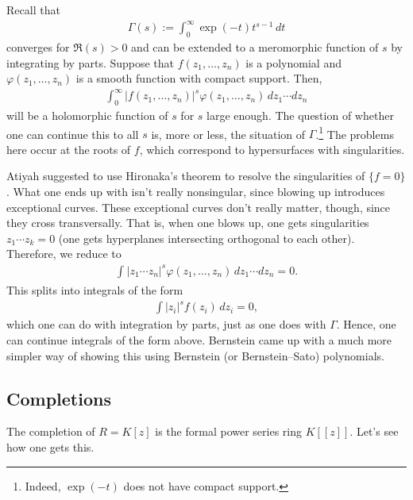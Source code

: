\documentclass [11 pt, oneside] {article}
\begin{document}
\begin{example}\label{}\text{}
Recall that
\begin{align*}
	\Gamma(s) :=  \int_{0}^{\infty}\exp(-t)t^{s-1}  \, dt
\end{align*}
	converges for $\Re (s)>0$ and can be extended to a meromorphic function of $s$ by integrating by parts. Suppose that $f(z_1,\hdots,z_n)$ is a polynomial and $\varphi(z_1,\hdots, z_n)$ is a smooth function with compact support. Then,
	\begin{align*}
		\int_{0}^{\infty} \left\lvert f(z_1,\hdots, z_n) \right\rvert ^s\varphi(z_1,\hdots,z_n)  \, dz_1\cdots dz_n 
	\end{align*}
	will be a holomorphic function of $s$ for $s$ large enough. The question of whether one can continue this to all $s$ is, more or less, the situation of $\Gamma$.\footnote{Indeed, $\exp({-t})$ does not have compact support.} The problems here occur at the roots of $f$, which correspond to hypersurfaces with singularities.
	
	Atiyah suggested to use Hironaka's theorem to resolve the singularities of $\{f=0\}$. What one ends up with isn't really nonsingular, since blowing up introduces exceptional curves. These exceptional curves don't really matter, though, since they cross transversally. That is, when one blows up, one gets singularities $z_1\cdots z_k=0$ (one gets hyperplanes intersecting orthogonal to each other). Therefore, we reduce to 
	\begin{align*}
		\int_{}^{}  \left\lvert z_1\cdots z_n \right\rvert^s\varphi(z_1,\hdots,z_n)   \, dz_1\cdots dz_n =0.
	\end{align*}
	This splits into integrals of the form
	\begin{align*}
		\int\left\lvert z_i \right\rvert ^sf(z_i)\, dz_i=0,
	\end{align*}
	which one can do with integration by parts, just as one does with $\Gamma$. Hence, one can continue integrals of the form above. Bernstein came up with a much more simpler way of showing this using Bernstein (or Bernstein--Sato) polynomials.
\end{example}

\subsection{Completions}
The completion of $R=K[z]$ is the formal power series ring $K[\![z]\!]$. Let's see how one gets this.
\end{document}
